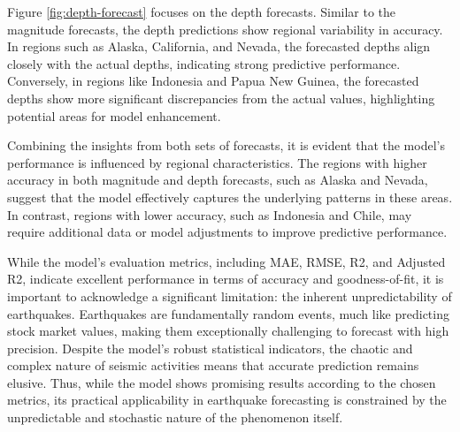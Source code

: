 
Figure \ref{fig:depth-forecast} focuses on the depth forecasts. Similar to the magnitude forecasts, the depth predictions show regional variability in accuracy. In regions such as Alaska, California, and Nevada, the forecasted depths align closely with the actual depths, indicating strong predictive performance. Conversely, in regions like Indonesia and Papua New Guinea, the forecasted depths show more significant discrepancies from the actual values, highlighting potential areas for model enhancement.

Combining the insights from both sets of forecasts, it is evident that the model's performance is influenced by regional characteristics. The regions with higher accuracy in both magnitude and depth forecasts, such as Alaska and Nevada, suggest that the model effectively captures the underlying patterns in these areas. In contrast, regions with lower accuracy, such as Indonesia and Chile, may require additional data or model adjustments to improve predictive performance.

While the model's evaluation metrics, including MAE, RMSE, R2, and Adjusted R2, indicate excellent performance in terms of accuracy and goodness-of-fit, it is important to acknowledge a significant limitation: the inherent unpredictability of earthquakes. Earthquakes are fundamentally random events, much like predicting stock market values, making them exceptionally challenging to forecast with high precision. Despite the model's robust statistical indicators, the chaotic and complex nature of seismic activities means that accurate prediction remains elusive. Thus, while the model shows promising results according to the chosen metrics, its practical applicability in earthquake forecasting is constrained by the unpredictable and stochastic nature of the phenomenon itself.


